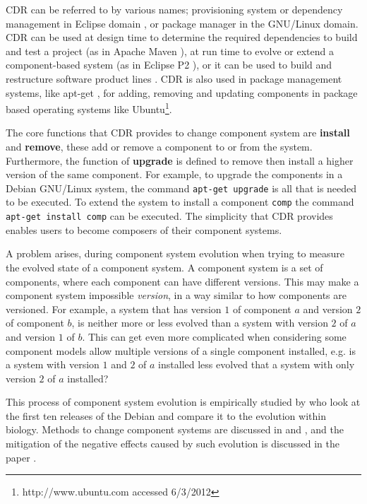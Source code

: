 CDR can be referred to by various names; provisioning system or dependency management in Eclipse domain \citep{leBerre2010},
or package manager in the GNU/Linux \citep{Barth2005} domain.
CDR can be used at design time to determine the required dependencies to build and test a project (as in Apache Maven \citep{casey_better_2008}),
at run time to evolve or extend a component-based system (as in Eclipse P2 \citep{leBerre2010}),
or it can be used to build and restructure software product lines \citep{savolainen_analyzing_2007}.
CDR is also used in package management systems, like apt-get \citep{Barth2005},
for adding, removing and updating components in package based operating systems like Ubuntu\footnote{http://www.ubuntu.com accessed 6/3/2012}. 

The core functions that CDR provides to change component system are \textbf{install} and \textbf{remove}, these add or remove a component to or from the system.
Furthermore, the function of \textbf{upgrade} is defined to remove then install a higher version of the same component.
For example, to upgrade the components in a Debian GNU/Linux system, the command \texttt{apt-get upgrade} is all that is needed to be executed.
To extend the system to install a component \texttt{comp} the command \texttt{apt-get install comp} can be executed.
The simplicity that CDR provides enables users to become composers of their component systems.

A problem arises, during component system evolution when trying to measure the evolved state of a component system.
A component system is a set of components, where each component can have different versions.
This may make a component system impossible \textit{version}, in a way similar to how components are versioned.
For example, a system that has version $1$ of component $a$ and version $2$ of component $b$, 
is neither more or less evolved than a system with version $2$ of $a$ and version $1$ of $b$.
This can get even more complicated when considering some component models allow multiple versions of a single component installed, e.g. 
is a system with version $1$ and $2$ of $a$ installed less evolved that a system with only version $2$ of $a$ installed?

This process of component system evolution is empirically studied by \cite{fortuna2011} 
who look at the first ten releases of the Debian and compare it to the evolution within biology.
Methods to change component systems are discussed in \citep{Ryan2005} and \citep{Luo2004},
and the mitigation of the negative effects caused by such evolution is discussed in the paper \citep{Stuckenholz2007}.

